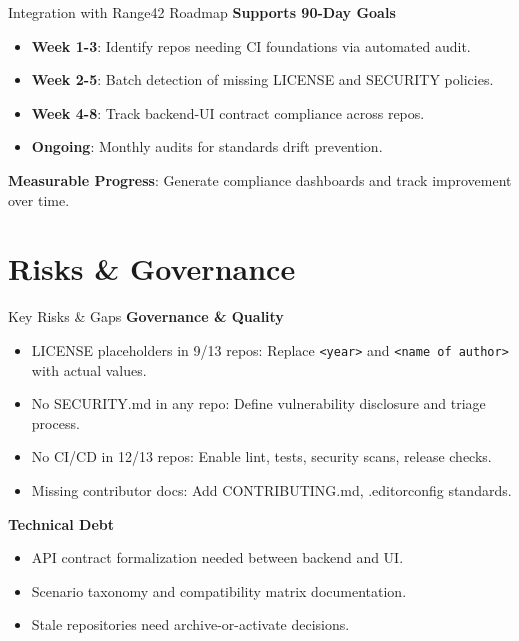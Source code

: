 \documentclass[aspectratio=169]{beamer}
\begin{document}
\begin{frame}{Integration with Range42 Roadmap}
  \faRocket\;
  \textbf{Supports 90-Day Goals}
  \begin{itemize}
    \item \textbf{Week 1-3}: Identify repos needing CI foundations via automated audit.
    \item \textbf{Week 2-5}: Batch detection of missing LICENSE and SECURITY policies.
    \item \textbf{Week 4-8}: Track backend-UI contract compliance across repos.
    \item \textbf{Ongoing}: Monthly audits for standards drift prevention.
  \end{itemize}
  \begin{tcolorbox}
    \faLightbulb\; \textbf{Measurable Progress}: Generate compliance dashboards and track improvement over time.
  \end{tcolorbox}
\end{frame}

\section{Risks \& Governance}

\begin{frame}{Key Risks \& Gaps \; \faExclamationTriangle}
  \textbf{Governance \& Quality}
  \begin{itemize}
    \item \alert{LICENSE placeholders in 9/13 repos}: Replace \texttt{<year>} and \texttt{<name of author>} with actual values.
    \item \alert{No SECURITY.md in any repo}: Define vulnerability disclosure and triage process.
    \item \alert{No CI/CD in 12/13 repos}: Enable lint, tests, security scans, release checks.
    \item \alert{Missing contributor docs}: Add CONTRIBUTING.md, .editorconfig standards.
  \end{itemize}
  \vspace{2mm}
  \textbf{Technical Debt}
  \begin{itemize}
    \item API contract formalization needed between backend and UI.
    \item Scenario taxonomy and compatibility matrix documentation.
    \item Stale repositories need archive-or-activate decisions.
  \end{itemize}
\end{frame}
\end{document}

